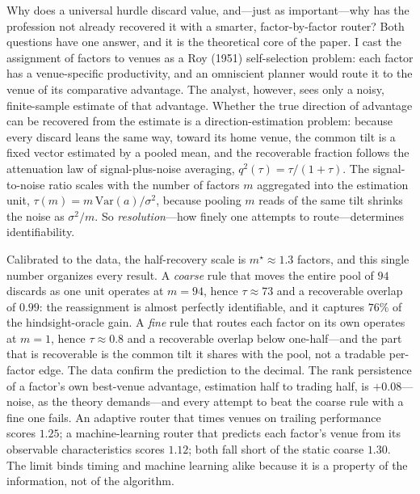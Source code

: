 \documentclass[12pt]{article}
\theoremstyle{plain}
\theoremstyle{definition}
\newcommand{\Var}{\mathrm{Var}}
\begin{document}
Why does a universal hurdle discard value, and---just as important---why has the
profession not already recovered it with a smarter, factor-by-factor router?
Both questions have one answer, and it is the theoretical core of the paper. I
cast the assignment of factors to venues as a Roy (1951) self-selection problem:
each factor has a venue-specific productivity, and an omniscient planner would
route it to the venue of its comparative advantage. The analyst, however, sees
only a noisy, finite-sample estimate of that advantage. Whether the true direction
of advantage can be recovered from the estimate is a direction-estimation
problem: because every discard leans the same way, toward its home venue, the
common tilt is a fixed vector estimated by a pooled mean, and the recoverable
fraction follows the attenuation law of signal-plus-noise averaging,
$q^2(\tau)=\tau/(1+\tau)$. The signal-to-noise ratio scales with the number of
factors $m$ aggregated into the estimation unit, $\tau(m)=m\,\Var(a)/\sigma^2$,
because pooling $m$ reads of the same tilt shrinks the noise as $\sigma^2/m$. So
\emph{resolution}---how finely one attempts to route---determines
identifiability.

Calibrated to the data, the half-recovery scale is $m^\star\approx1.3$ factors,
and this single number organizes every result. A \emph{coarse} rule that moves
the entire pool of $94$ discards as one unit operates at $m=94$, hence
$\tau\approx73$ and a recoverable overlap of $0.99$: the reassignment is almost
perfectly identifiable, and it captures $76\%$ of the hindsight-oracle gain. A
\emph{fine} rule that routes each factor on its own operates at $m=1$, hence
$\tau\approx0.8$ and a recoverable overlap below one-half---and the part that is
recoverable is the common tilt it shares with the pool, not a tradable per-factor
edge. The data confirm the prediction to the decimal. The rank persistence of a
factor's own best-venue advantage, estimation half to trading half, is
$+0.08$---noise, as the theory demands---and every attempt to beat the coarse
rule with a fine one fails. An adaptive router that times venues on trailing
performance scores $1.25$; a machine-learning router that predicts each factor's
venue from its observable characteristics scores $1.12$; both fall short of the
static coarse $1.30$. The limit binds timing and machine learning alike because it
is a property of the information, not of the algorithm.
\end{document}
